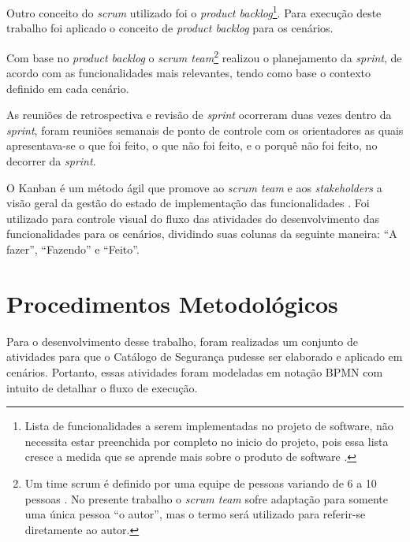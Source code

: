 Outro conceito do \textit{scrum} utilizado foi o \textit{product backlog}\footnote[2]{Lista de funcionalidades a serem implementadas no projeto de software, não necessita estar preenchida por completo no inicio do projeto, pois essa lista cresce a medida que se aprende mais sobre o produto de software \cite{schwaber2002agile}.}. Para execução deste trabalho foi aplicado o conceito de \textit{product backlog} para os cenários.

Com base no \textit{product backlog} o \textit{scrum team}\footnote[3]{Um time scrum é definido por uma equipe de pessoas variando de 6 a 10 pessoas \cite{schwaber2002agile}. No presente trabalho o \textit{scrum team} sofre adaptação para somente uma única pessoa “o autor”, mas o termo será utilizado para referir-se diretamente ao autor.} realizou o planejamento da \textit{sprint}, de acordo com as funcionalidades mais relevantes, tendo como base o contexto definido em cada cenário. 

As reuniões de retrospectiva e revisão de \textit{sprint} ocorreram duas vezes dentro da \textit{sprint}, foram reuniões semanais de ponto de controle com os orientadores as quais apresentava-se o que foi feito, o que não foi feito, e o porquê não foi feito, no decorrer da \textit{sprint}. 

O Kanban é um método ágil que promove ao \textit{scrum team} e aos \textit{stakeholders} a visão geral da gestão do estado de implementação das funcionalidades \cite{prikladnicki2014metodos}. Foi utilizado para controle visual do fluxo das atividades do desenvolvimento das funcionalidades para os cenários, dividindo suas colunas da seguinte maneira: “A fazer”, “Fazendo” e “Feito”.

\section{Procedimentos Metodológicos}
\label{sec:procedimentosMetodológicos}

Para o desenvolvimento desse trabalho, foram realizadas um conjunto de atividades para que o Catálogo de Segurança pudesse ser elaborado e aplicado em cenários. Portanto, essas atividades foram modeladas em notação BPMN com intuito de detalhar o fluxo de execução.

